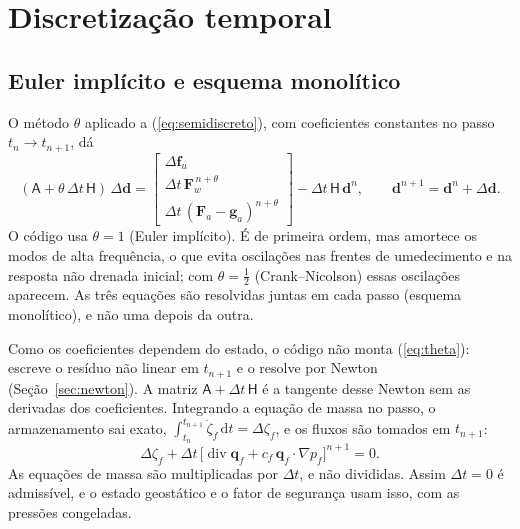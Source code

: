 \documentclass[11pt,a4paper]{article}
\newcommand{\vq}{\bm q}
\newcommand{\dv}{\operatorname{div}}
\newcommand{\mt}[1]{\mathsf{#1}}
\newcommand{\dd}{\mathrm d}
\begin{document}
\section{Discretização temporal}
\label{sec:temporal}

\subsection{Euler implícito e esquema monolítico}
O método $\theta$ aplicado a (\ref{eq:semidiscreto}), com coeficientes constantes no passo
$t_n\to t_{n+1}$, dá
\begin{equation}
(\mt A+\theta\,\Delta t\,\mt H)\,\Delta\mathbf d=
\begin{bmatrix}\Delta\mathbf f_u\\\Delta t\,\mathbf F_w^{\,n+\theta}\\
\Delta t\,(\mathbf F_a-\mathbf g_a)^{n+\theta}\end{bmatrix}
-\Delta t\,\mt H\,\mathbf d^{n},\qquad
\mathbf d^{n+1}=\mathbf d^{n}+\Delta\mathbf d .
\label{eq:theta}
\end{equation}
O código usa $\theta=1$ (Euler implícito). É de primeira ordem, mas amortece os modos de alta
frequência, o que evita oscilações nas frentes de umedecimento e na resposta não drenada
inicial; com $\theta=\tfrac12$ (Crank--Nicolson) essas oscilações aparecem. As três equações
são resolvidas juntas em cada passo (esquema monolítico), e não uma depois da outra.

Como os coeficientes dependem do estado, o código não monta (\ref{eq:theta}): escreve o
resíduo não linear em $t_{n+1}$ e o resolve por Newton (Seção~\ref{sec:newton}). A matriz
$\mt A+\Delta t\,\mt H$ é a tangente desse Newton sem as derivadas dos coeficientes.
Integrando a equação de massa no passo, o armazenamento sai exato,
$\int_{t_n}^{t_{n+1}}\dot\zeta_f\,\dd t=\Delta\zeta_f$, e os fluxos são tomados em $t_{n+1}$:
\begin{equation}
\Delta\zeta_f+\Delta t\,\big[\dv\vq_f+c_f\,\vq_f\cdot\nabla p_f\big]^{n+1}=0 .
\label{eq:euler}
\end{equation}
As equações de massa são multiplicadas por $\Delta t$, e não divididas. Assim $\Delta t=0$ é
admissível, e o estado geostático e o fator de segurança usam isso, com as pressões
congeladas.
\end{document}
